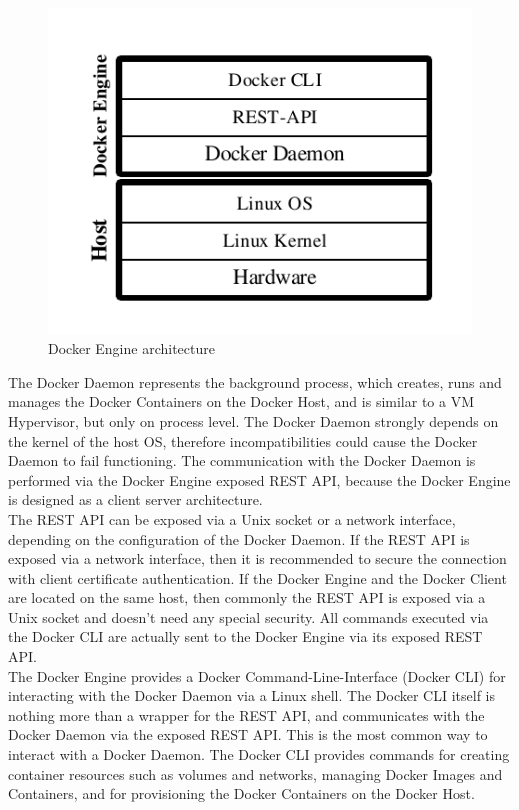 \begin{figure}[htbp]
	\centering
	\includegraphics[scale=1]{images/docker-engine.pdf}
	\caption{Docker Engine architecture}
	\label{fig:docker-engine}
\end{figure} 

\label{sec:docker-daemon}
The Docker Daemon represents the background process, which creates, runs and manages the Docker Containers on the Docker Host, and is similar to a VM Hypervisor, but only on process level. The Docker Daemon strongly depends on the kernel of the host OS, therefore incompatibilities could cause the Docker Daemon to fail functioning. The communication with the Docker Daemon is performed via the Docker Engine exposed REST API,  because the Docker Engine is designed as a client server architecture. \\

\label{sec:docker-rest-api}
The REST API can be exposed via a Unix socket or a network interface, depending on the configuration of the Docker Daemon. If the REST API is exposed via a network interface, then it is recommended to secure the connection with client certificate authentication. If the Docker Engine and the Docker Client are located on the same host, then commonly the REST API is exposed via a Unix socket and doesn't need any special security. All commands executed via the Docker CLI are actually sent to the Docker Engine via its exposed REST API. \\

\label{sec:docker-cli}
The Docker Engine provides a Docker Command-Line-Interface (Docker CLI) for interacting with the Docker Daemon via a Linux shell. The Docker CLI itself is nothing more than a wrapper for the REST API, and communicates with the Docker Daemon via the exposed REST API. This is the most common way to interact with a Docker Daemon. The Docker CLI provides commands for creating container resources such as volumes and networks, managing Docker Images and Containers, and for provisioning the Docker Containers on the Docker Host. \\


